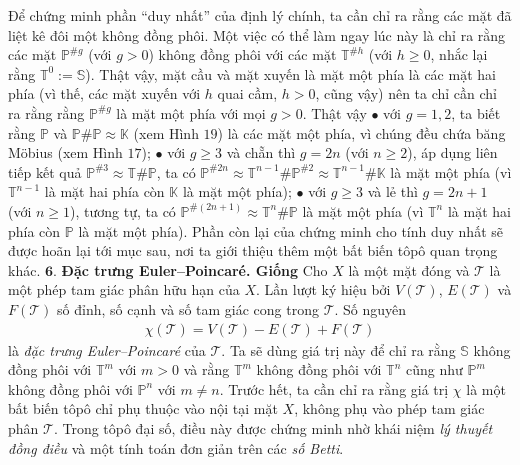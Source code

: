 \begin{multicols}{2}
	\vskip 0.1cm
	Để chứng minh phần ``duy nhất'' của định lý chính, ta cần chỉ ra rằng các mặt đã liệt kê đôi một không đồng phôi. Một việc có thể làm ngay lúc này là chỉ ra rằng các mặt $\mathbb{P}^{\# g}$ (với $g > 0$) không đồng phôi với các mặt $\mathbb{T}^{\# h}$ (với $h \ge 0$, nhắc lại rằng $\mathbb{T}^0 := \mathbb{S}$). Thật vậy, mặt cầu và mặt xuyến là mặt một phía là các mặt hai phía (vì thế, các mặt xuyến với $h$ quai cầm, $h > 0$, cũng vậy) nên ta chỉ cần chỉ ra rằng rằng $\mathbb{P}^{\# g}$ là mặt một phía với mọi $g > 0$. Thật vậy
	\vskip 0.1cm
	$\bullet$ với $g = 1,2$, ta biết rằng $\mathbb{P}$ và $\mathbb{P} \# \mathbb{P} \approx \mathbb{K}$ (xem Hình $19$) là các mặt một phía, vì chúng đều chứa băng M\"obius (xem Hình $17$);
	\vskip 0.1cm
	$\bullet$ với $g \ge 3$ và chẵn thì $g = 2n$ (với $n \ge 2$), áp dụng liên tiếp kết quả $\mathbb{P}^{\# 3} \approx \mathbb{T} \# \mathbb{P}$, ta có $\mathbb{P}^{\# 2n} \approx \mathbb{T}^{n-1} \# \mathbb{P}^{\# 2} \approx \mathbb{T}^{n-1} \# \mathbb{K}$ là mặt một phía (vì $\mathbb{T}^{n-1}$ là mặt hai phía còn $\mathbb{K}$ là mặt một phía);
	\vskip 0.1cm	
	$\bullet$ với $g \ge 3$ và lẻ thì $g = 2n+1$ (với $n \ge 1$), tương tự, ta có $\mathbb{P}^{\#(2n+1)} \approx \mathbb{T}^n \# \mathbb{P}$ là mặt một phía (vì $\mathbb{T}^{n}$ là mặt hai phía còn $\mathbb{P}$ là mặt một phía).
	\vskip 0.1cm
	Phần còn lại của chứng minh cho tính duy nhất sẽ được hoãn lại tới mục sau, nơi ta giới thiệu thêm một bất biến tôpô quan trọng khác.
	\vskip 0.1cm
	$\pmb{6.}$ \textbf{\color{duongvaotoanhoc}Đặc trưng Euler--Poincar\'e. Giống}
	\vskip 0.1cm
	Cho $X$ là một mặt đóng và $\mathscr{T}$ là một phép tam giác phân hữu hạn của $X$. Lần lượt ký hiệu bởi $V(\mathscr{T})$, $E(\mathscr{T})$ và $F(\mathscr{T})$ số đỉnh, số cạnh và số tam giác cong trong $\mathscr{T}$. Số nguyên
	\begin{align*}
		\chi(\mathscr{T}) = V(\mathscr{T}) - E(\mathscr{T}) + F(\mathscr{T})
	\end{align*}
	là {\it đặc trưng Euler--Poincar\'e} của $\mathscr{T}$. Ta sẽ dùng giá trị này để chỉ ra rằng $\mathbb{S}$ không đồng phôi với $\mathbb{T}^m$ với $m > 0$ và rằng $\mathbb{T}^m$ không đồng phôi với $\mathbb{T}^n$ cũng như $\mathbb{P}^m$ không đồng phôi với $\mathbb{P}^n$ với $m \neq n$. Trước hết, ta cần chỉ ra rằng giá trị $\chi$ là một bất biến tôpô chỉ phụ thuộc vào nội tại mặt $X$, không phụ vào phép tam giác phân $\mathscr{T}$. Trong tôpô đại số, điều này được chứng minh nhờ khái niệm {\it lý thuyết đồng điều} và một tính toán đơn giản trên các {\it số Betti}. 
	\vskip 0.1cm

\end{multicols}
